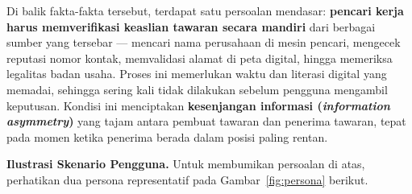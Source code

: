 \documentclass[12pt,a4paper]{article}
\begin{document}
Di balik fakta-fakta tersebut, terdapat satu persoalan mendasar: \textbf{pencari kerja harus
memverifikasi keaslian tawaran secara mandiri} dari berbagai sumber yang tersebar --- mencari nama
perusahaan di mesin pencari, mengecek reputasi nomor kontak, memvalidasi alamat di peta digital,
hingga memeriksa legalitas badan usaha. Proses ini memerlukan waktu dan literasi digital yang
memadai, sehingga sering kali tidak dilakukan sebelum pengguna mengambil keputusan. Kondisi ini
menciptakan \textbf{kesenjangan informasi (\textit{information asymmetry})} yang tajam antara
pembuat tawaran dan penerima tawaran, tepat pada momen ketika penerima berada dalam posisi paling
rentan.

\vspace{0.1cm}
\textbf{Ilustrasi Skenario Pengguna.} Untuk membumikan persoalan di atas, perhatikan dua persona
representatif pada Gambar~\ref{fig:persona} berikut.
\end{document}
